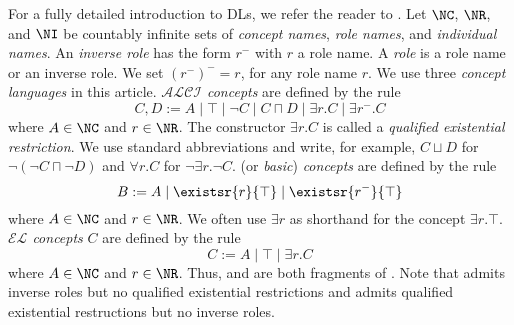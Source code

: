 \documentclass{lmcs}
\theoremstyle{definition}
\begin{document}
For a fully detailed introduction to DLs, we refer the reader to
\cite{Baader-et-al-03b,DBLP:books/daglib/0041477}.  Let $\NC$, $\NR$,
and $\NI$ be countably infinite sets of \emph{concept names},
\emph{role names}, and \emph{individual names}. An \emph{inverse role}
has the form $r^-$ with $r$ a role name. A \emph{role} is a role name
or an inverse role. We set $(r^-)^-=r$, for any role name $r$.  We use
three \emph{concept languages} in this article. \emph{$\mathcal{ALCI}$
  concepts} are defined by the rule
$$
C,D:= A \mid \top \mid \neg C \mid C \sqcap D \mid\exists r.C \mid \exists r^{-}.C 
$$
where $A\in \NC$ and $r\in \NR$. The constructor $\exists r.C$ is called a \emph{qualified existential restriction}. 
We use standard abbreviations and write, for example, $C \sqcup D$ for 
$\neg (\neg C \sqcap \neg D)$ and $\forall r.C$ for $\neg \exists r.\neg C$. \emph{\dllitecore} (or \emph{basic}) \emph{concepts} are 
defined by the rule
$$
B := A \mid \existsr{r}{\top} \mid \existsr{r^-}{\top}
$$
where $A\in \NC$ and $r\in \NR$. We often use $\exists r$ as shorthand
for the concept $\exists r.\top$. 
\emph{$\mathcal{EL}$ concepts} $C$ are defined by the rule
$$
C:= A \mid \top \mid \exists r.C 
$$
where $A\in \NC$ and $r\in \NR$. Thus, \dllitecore and \EL are both fragments of \alci. Note that \dllitecore admits inverse roles
but no qualified existential restrictions and \EL admits qualified existential restructions but no inverse roles. 
\end{document}
